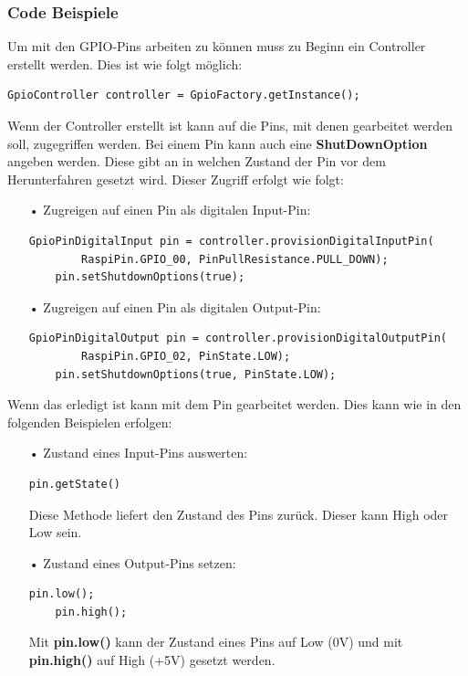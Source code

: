 \newpage

\subsubsection{Code Beispiele}
Um mit den GPIO-Pins arbeiten zu können muss zu Beginn ein Controller erstellt werden. Dies ist wie folgt möglich:
\begin{lstlisting}[style=JavaStyle]
	GpioController controller = GpioFactory.getInstance();
\end{lstlisting}
Wenn der Controller erstellt ist kann auf die Pins, mit denen gearbeitet werden soll, zugegriffen werden. Bei einem Pin kann auch eine \textbf{ShutDownOption} angeben werden. Diese gibt an in welchen Zustand der Pin vor dem Herunterfahren gesetzt wird. Dieser Zugriff erfolgt wie folgt: 
\begin{itemize}
\item[•] Zugreigen auf einen Pin als digitalen Input-Pin:
\begin{lstlisting}[style=JavaStyle]
	GpioPinDigitalInput pin = controller.provisionDigitalInputPin(
		RaspiPin.GPIO_00, PinPullResistance.PULL_DOWN);
	pin.setShutdownOptions(true);
\end{lstlisting}
\item[•] Zugreigen auf einen Pin als digitalen Output-Pin:
\begin{lstlisting}[style=JavaStyle]
	GpioPinDigitalOutput pin = controller.provisionDigitalOutputPin(
		RaspiPin.GPIO_02, PinState.LOW);
	pin.setShutdownOptions(true, PinState.LOW);
\end{lstlisting}
\end{itemize}
Wenn das erledigt ist kann mit dem Pin gearbeitet werden. Dies kann wie in den folgenden Beispielen erfolgen:
\begin{itemize}
\item[•] Zustand eines Input-Pins auswerten: 
\begin{lstlisting}[style=JavaStyle]
	pin.getState()
\end{lstlisting}
Diese Methode liefert den Zustand des Pins zurück. Dieser kann High oder Low sein.
\item[•] Zustand eines Output-Pins setzen:
\begin{lstlisting}[style=JavaStyle]
	pin.low();	
	pin.high();
\end{lstlisting}
Mit \textbf{pin.low()} kann der Zustand eines Pins auf Low (0V) und mit \textbf{pin.high()} auf High (+5V) gesetzt werden. 
\end{itemize}

